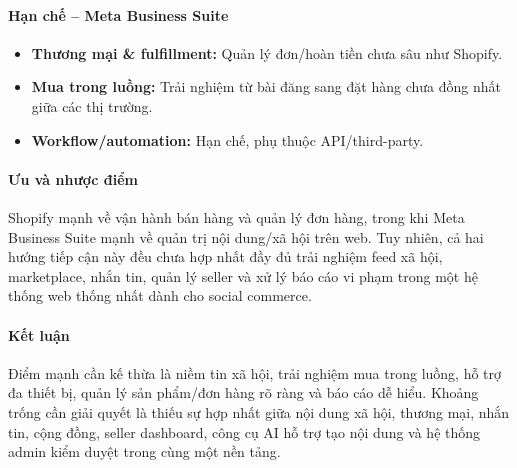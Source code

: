 \paragraph{Hạn chế – Meta Business Suite}
\begin{itemize}
    \item \textbf{Thương mại \& fulfillment:} Quản lý đơn/hoàn tiền chưa sâu như Shopify.
    \item \textbf{Mua trong luồng:} Trải nghiệm từ bài đăng sang đặt hàng chưa đồng nhất giữa các thị trường.
    \item \textbf{Workflow/automation:} Hạn chế, phụ thuộc API/third-party.
\end{itemize}

\paragraph{Ưu và nhược điểm}
Shopify mạnh về vận hành bán hàng và quản lý đơn hàng, trong khi Meta Business Suite mạnh về quản trị nội dung/xã hội trên web. Tuy nhiên, cả hai hướng tiếp cận này đều chưa hợp nhất đầy đủ trải nghiệm feed xã hội, marketplace, nhắn tin, quản lý seller và xử lý báo cáo vi phạm trong một hệ thống web thống nhất dành cho social commerce.

\paragraph{Kết luận}
Điểm mạnh cần kế thừa là niềm tin xã hội, trải nghiệm mua trong luồng, hỗ trợ đa thiết bị, quản lý sản phẩm/đơn hàng rõ ràng và báo cáo dễ hiểu. Khoảng trống cần giải quyết là thiếu sự hợp nhất giữa nội dung xã hội, thương mại, nhắn tin, cộng đồng, seller dashboard, công cụ AI hỗ trợ tạo nội dung và hệ thống admin kiểm duyệt trong cùng một nền tảng.

